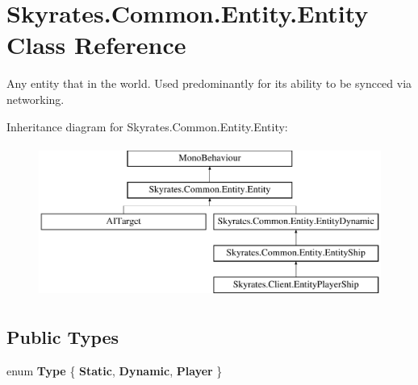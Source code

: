\hypertarget{class_skyrates_1_1_common_1_1_entity_1_1_entity}{\section{Skyrates.\-Common.\-Entity.\-Entity Class Reference}
\label{class_skyrates_1_1_common_1_1_entity_1_1_entity}
}


Any entity that in the world. Used predominantly for its ability to be syncced via networking.  


Inheritance diagram for Skyrates.\-Common.\-Entity.\-Entity\-:\begin{figure}[H]
\begin{center}
\leavevmode
\includegraphics[height=5.000000cm]{class_skyrates_1_1_common_1_1_entity_1_1_entity}
\end{center}
\end{figure}
\subsection*{Public Types}
\begin{DoxyCompactItemize}
\item 
enum {\bfseries Type} \{ {\bfseries Static}, 
{\bfseries Dynamic}, 
{\bfseries Player}
 \}
\end{DoxyCompactItemize}
